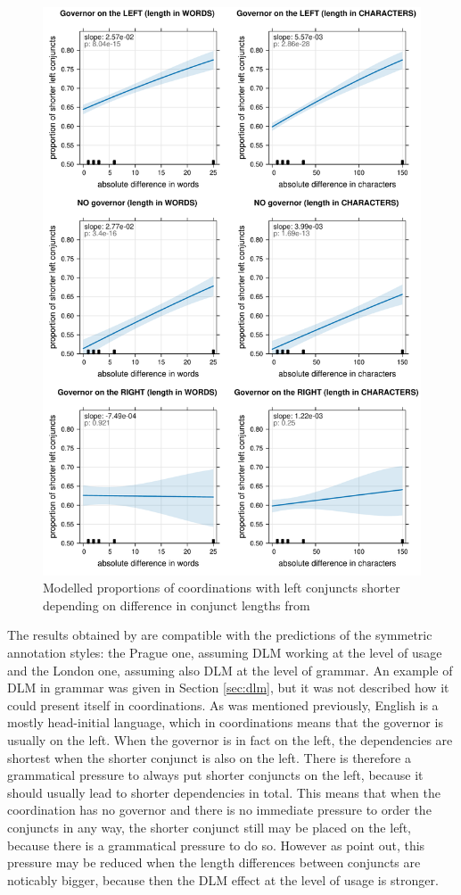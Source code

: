 \begin{figure}[H]
    \includegraphics[scale=0.35]{inputs/ptb-R.pdf}
    \caption{Modelled proportions of coordinations with left conjuncts shorter depending on difference in conjunct lengths from \cite{prz:woz:23}}\label{fig:pw23-results}
\end{figure}

The results obtained by \cite{prz:woz:23} are compatible with the predictions of the symmetric annotation styles: the Prague one, assuming DLM working at the level of usage and the London one, assuming also DLM at the level of grammar. An example of DLM in grammar was given in Section \ref{sec:dlm}, but it was not described how it could present itself in coordinations. As was mentioned previously, English is a mostly head-initial language, which in  coordinations means that the governor is usually on the left. When the governor is in fact on the left, the dependencies are shortest when the shorter conjunct is also on the left. There is therefore a grammatical pressure to always put shorter conjuncts on the left, because it should usually lead to shorter dependencies in total. This means that when the coordination has no governor and there is no immediate pressure to order the conjuncts in any way, the shorter conjunct still may be placed on the left, because there is a grammatical pressure to do so.  However as \cite{prz:woz:23} point out, this pressure may be reduced when the length differences between conjuncts are noticably bigger, because then the DLM effect at the level of usage is stronger. 

